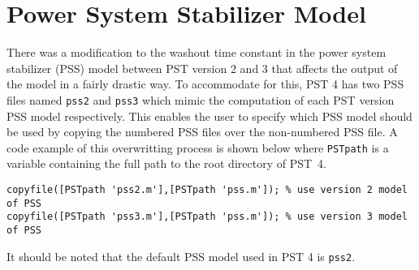 \section{Power System Stabilizer Model}  
There was a modification to the washout time constant in the power system stabilizer (PSS) model between PST version 2 and 3 that affects the output of the model in a fairly drastic way.
To accommodate for this, PST 4 has two PSS files named \verb|pss2| and \verb|pss3| which mimic the computation of each PST version PSS model respectively.
This enables the user to specify which PSS model should be used by copying the numbered PSS files over the non-numbered PSS file.
A code example of this overwritting process is shown below where \verb|PSTpath| is a variable containing the full path to the root directory of \mbox{PST 4}.

\begin{verbatim}
copyfile([PSTpath 'pss2.m'],[PSTpath 'pss.m']); % use version 2 model of PSS
copyfile([PSTpath 'pss3.m'],[PSTpath 'pss.m']); % use version 3 model of PSS
\end{verbatim}

\noindent It should be noted that the default PSS model used in PST 4 is \verb|pss2|.

